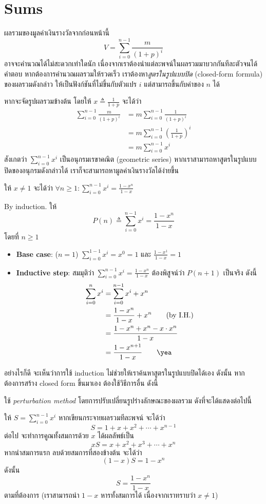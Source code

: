 \section{Sums}

ผลรวมของมูลค่าเงินรางวัลจากก่อนหน้านี้ \[V=\sum_{i=0}^{n-1}\frac{m}{(1+p)^i}\] อาจจะคำนวณได้ไม่สะดวกเท่าใดนัก เนื่องจากเราต้องนำแต่ละพจน์ในผลรวมมาบวกกันทีละตัวจนได้คำตอบ \enskip หากต้องการคำนวณผลรวมให้รวดเร็ว เราต้องหา\emph{สูตรในรูปแบบปิด} (closed-form formula) ของผลรวมดังกล่าว ให้เป็นฟังก์ชันที่ไม่ขึ้นกับตัวแปร $i$ แต่สามารถขึ้นกับค่าของ $n$ ได้

หากจะจัดรูปผลรวมข้างต้น โดยให้ $x\triangleq \frac{1}{1+p}$ จะได้ว่า
\begin{align*}
\sum_{i=0}^{n-1}\frac{m}{(1+p)^i}
&=m\sum_{i=0}^{n-1}\frac{1}{(1+p)^i} \\
&=m\sum_{i=0}^{n-1}\left(\frac{1}{1+p}\right)^i \\
&=m\sum_{i=0}^{n-1}x^i
\end{align*}
สังเกตว่า $\sum_{i=0}^{n-1}{x^i}$ เป็นอนุกรมเรขาคณิต (geometric series) \enskip หากเราสามารถหาสูตรในรูปแบบปิดของอนุกรมดังกล่าวได้ เราก็จะสามารถหามูลค่าเงินรางวัลได้ง่ายขึ้น
\begin{theorem}\label{thm:geom-sum}
ให้ $x\neq 1$ \enskip จะได้ว่า $\forall n\geq 1: \sum_{i=0}^{n-1}x^i=\frac{1-x^n}{1-x}$
\begin{pf}
By induction.  ให้ \[P(n)\triangleq \sum_{i=0}^{n-1}x^i=\frac{1-x^n}{1-x}\] โดยที่ $n\geq 1$
\begin{itemize}
\item {\bf Base case}: ($n=1$) \quad $\sum_{i=0}^{1-1}x^i=x^0=1$ และ $\frac{1-x^1}{1-x}=1$ \quad\yea
\item {\bf Inductive step}: สมมุติว่า $\sum_{i=0}^{n-1}x^i=\frac{1-x^n}{1-x}$ \enskip ต้องพิสูจน์ว่า $P(n+1)$ เป็นจริง ดังนี้
\begin{align*}
\sum_{i=0}^n x^i
&=\sum_{i=0}^{n-1}x^i+x^n \\
&=\frac{1-x^n}{1-x}+x^n \qquad\textup{(by I.H.)} \\
&=\frac{1-x^n+x^n-x\cdot x^n}{1-x} \\
&=\frac{1-x^{n+1}}{1-x} \qquad\textup{\yea}
\end{align*}
\end{itemize}
\end{pf}
อย่างไรก็ดี จะเห็นว่าการใช้ induction ไม่ช่วยให้เราค้นหาสูตรในรูปแบบปิดได้เอง \enskip ดังนั้น หากต้องการสร้าง closed form ขึ้นมาเอง ต้องใช้วิธีการอื่น ดังนี้
\begin{pf}
ใช้ \emph{perturbation method} โดยการปรับเปลี่ยนรูปร่างลักษณะของผลรวม ดังที่จะได้แสดงต่อไปนี้

ให้ $S=\sum_{i=0}^{n-1}x^i$ \enskip หากเขียนกระจายผลรวมทีละพจน์ จะได้ว่า \[S=1+x+x^2+\cdots+x^{n-1}\] ต่อไป จะทำการคูณทั้งสมการด้วย $x$ ได้ผลลัพธ์เป็น \[xS=x+x^2+x^3+\cdots+x^n\] หากนำสมการแรก ลบด้วยสมการที่สองข้างต้น จะได้ว่า \[(1-x)S=1-x^n\] ดังนั้น \[S=\frac{1-x^n}{1-x}\] ตามที่ต้องการ (เราสามารถนำ $1-x$ หารทั้งสมการได้ เนื่องจากเราทราบว่า $x\neq 1$)
\end{pf}
\end{theorem}

